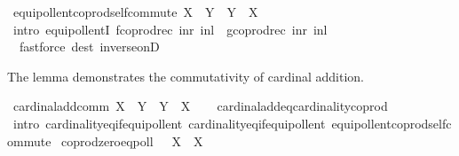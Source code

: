 \begin{isabellebody}
%
\endisatagproof
{\isafoldproof}%
%
\isadelimproof
\isanewline
%
\endisadelimproof
\isanewline
{}\isamarkupfalse%
\ equipollent{\isacharunderscore}{\kern0pt}coprod{\isacharunderscore}{\kern0pt}self{\isacharunderscore}{\kern0pt}commute{\isacharcolon}{\kern0pt}\ {\isachardoublequoteopen}X\ {\isasymCoprod}\ Y\ {\isasymapprox}\ Y\ {\isasymCoprod}\ X{\isachardoublequoteclose}\isanewline
%
\isadelimproof
\ \ %
\endisadelimproof
%
\isatagproof
{}\isamarkupfalse%
\ {\isacharparenleft}{\kern0pt}intro\ equipollentI{\isacharbrackleft}{\kern0pt}\ {\isacharquery}{\kern0pt}f{\isacharequal}{\kern0pt}{\isachardoublequoteopen}coprod{\isacharunderscore}{\kern0pt}rec\ inr\ inl{\isachardoublequoteclose}\ \ {\isacharquery}{\kern0pt}g{\isacharequal}{\kern0pt}{\isachardoublequoteopen}coprod{\isacharunderscore}{\kern0pt}rec\ inr\ inl{\isachardoublequoteclose}{\isacharbrackright}{\kern0pt}{\isacharparenright}{\kern0pt}\isanewline
\ \ {\isacharparenleft}{\kern0pt}fastforce\ dest{\isacharcolon}{\kern0pt}\ inverse{\isacharunderscore}{\kern0pt}onD{\isacharparenright}{\kern0pt}%
\endisatagproof
{\isafoldproof}%
%
\isadelimproof
%
\endisadelimproof
%
\begin{isamarkuptext}%
The lemma demonstrates the commutativity of cardinal addition.%
\end{isamarkuptext}\isamarkuptrue%
\isamarkupfalse%
\ cardinal{\isacharunderscore}{\kern0pt}add{\isacharunderscore}{\kern0pt}comm{\isacharcolon}{\kern0pt}\ {\isachardoublequoteopen}X\ {\isasymoplus}\ Y\ {\isacharequal}{\kern0pt}\ Y\ {\isasymoplus}\ X{\isachardoublequoteclose}\isanewline
%
\isadelimproof
\ \ %
\endisadelimproof
%
\isatagproof
{}\isamarkupfalse%
\ cardinal{\isacharunderscore}{\kern0pt}add{\isacharunderscore}{\kern0pt}eq{\isacharunderscore}{\kern0pt}cardinality{\isacharunderscore}{\kern0pt}coprod\isanewline
\ \ \isamarkupfalse%
\ {\isacharparenleft}{\kern0pt}intro\ cardinality{\isacharunderscore}{\kern0pt}eq{\isacharunderscore}{\kern0pt}if{\isacharunderscore}{\kern0pt}equipollent\ cardinality{\isacharunderscore}{\kern0pt}eq{\isacharunderscore}{\kern0pt}if{\isacharunderscore}{\kern0pt}equipollent\ equipollent{\isacharunderscore}{\kern0pt}coprod{\isacharunderscore}{\kern0pt}self{\isacharunderscore}{\kern0pt}commute{\isacharparenright}{\kern0pt}%
\endisatagproof
{\isafoldproof}%
%
\isadelimproof
\isanewline
%
\endisadelimproof
\isanewline
{}\isamarkupfalse%
\ coprod{\isacharunderscore}{\kern0pt}zero{\isacharunderscore}{\kern0pt}eqpoll{\isacharcolon}{\kern0pt}\ {\isachardoublequoteopen}{\isacharbraceleft}{\kern0pt}{\isacharbraceright}{\kern0pt}\ {\isasymCoprod}\ X\ {\isasymapprox}\ X{\isachardoublequoteclose}\isanewline

\end{isabellebody}

